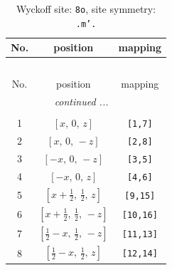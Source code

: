 \documentclass[fleqn,8pt]{jsarticle}
\begin{document}
\begin{longtable}{ccc}
\caption{Wyckoff site: {\tt 8o}, site symmetry: {\tt .m'.}}
 \\
 \hline \hline
No. & position & mapping \\ \hline \endfirsthead

\multicolumn{2}{l}{\tablename\ \thetable{}} \\
 \hline \hline
No. & position & mapping \\ \hline \endhead

 \hline \hline
\multicolumn{2}{r}{\footnotesize\it continued ...} \\ \endfoot

 \hline \hline
\multicolumn{2}{r}{} \\ \endlastfoot

1 & $\left[ x,\, 0,\, z \right]$ & {\tt [1,7]} \\ \hline
2 & $\left[ x,\, 0,\, - z \right]$ & {\tt [2,8]} \\ \hline
3 & $\left[ - x,\, 0,\, - z \right]$ & {\tt [3,5]} \\ \hline
4 & $\left[ - x,\, 0,\, z \right]$ & {\tt [4,6]} \\ \hline
5 & $\left[ x + \frac{1}{2},\, \frac{1}{2},\, z \right]$ & {\tt [9,15]} \\ \hline
6 & $\left[ x + \frac{1}{2},\, \frac{1}{2},\, - z \right]$ & {\tt [10,16]} \\ \hline
7 & $\left[ \frac{1}{2} - x,\, \frac{1}{2},\, - z \right]$ & {\tt [11,13]} \\ \hline
8 & $\left[ \frac{1}{2} - x,\, \frac{1}{2},\, z \right]$ & {\tt [12,14]} \\
\end{longtable}
\renewcommand{\arraystretch}{1.2}
\end{document}
